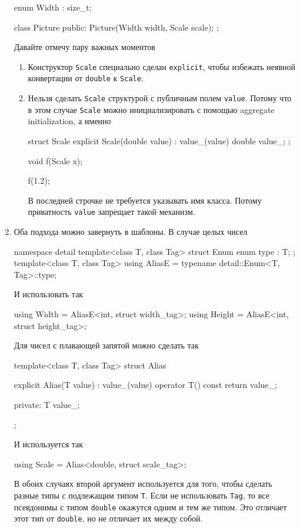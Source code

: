 \begin{enumerate}
\begin{cppcode}
enum Width : size_t;

class Picture {
public:
  Picture(Width width, Scale scale);
};
\end{cppcode}
Давайте отмечу пару важных моментов
\begin{enumerate}
\item Конструктор \verb"Scale" специально сделан \verb"explicit", чтобы избежать неявной конвертации от \verb"double" к \verb"Scale".

\item Нельзя сделать \verb"Scale" структурой с публичным полем \verb"value".
Потому что в этом случае \verb"Scale" можно инициализировать с помощью aggregate initialization, а именно
\begin{cppcode}
struct Scale {
  explicit Scale(double value) : value_(value) {
  }
  double value_;
};

void f(Scale x);

f({1.2});
\end{cppcode}
В последней строчке не требуется указывать имя класса.
Потому приватность \verb"value" запрещает такой механизм.
\end{enumerate}

\item Оба подхода можно завернуть в шаблоны.
В случае целых чисел
\begin{cppcode}
namespace detail {
template<class T, class Tag>
struct Enum {
  enum type : T;
};
}
template<class T, class Tag>
using AliasE = typename detail::Enum<T, Tag>::type;
\end{cppcode}
И использовать так
\begin{cppcode}
using Width = AliasE<int, struct width_tag>;
using Height = AliasE<int, struct height_tag>;
\end{cppcode}
Для чисел с плавающей запятой можно сделать так
\begin{cppcode}
template<class T, class Tag>
struct Alias {
  explicit Alias(T value) : value_(value) {
  }
  operator T() const {
    return value_;
  }

private:
  T value_;
};
\end{cppcode}
И используется так
\begin{cppcode}
using Scale = Alias<double, struct scale_tag>;
\end{cppcode}
В обоих случаях второй аргумент используется для того, чтобы сделать разные типы с подлежащим типом \verb"T".
Если не использовать \verb"Tag", то все псевдонимы с типом \verb"double" окажутся одним и тем же типом.
Это отличает этот тип от \verb"double", но не отличает их между собой.
\end{enumerate}

